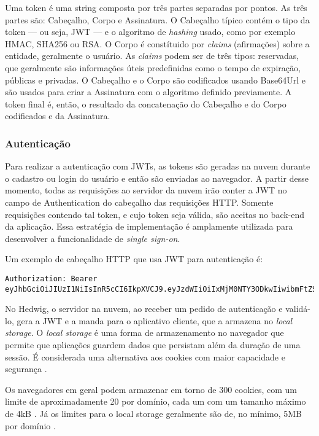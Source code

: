 Uma token é uma string composta por três partes separadas por pontos. As três partes são: Cabeçalho, Corpo e Assinatura. O Cabeçalho típico contém o tipo da token --- ou seja, JWT --- e o algoritmo de \textit{hashing} usado, como por exemplo HMAC, SHA256 ou RSA. O Corpo é constítuido por \textit{claims} (afirmações) sobre a entidade, geralmente o usuário. As \textit{claims} podem ser de três tipos: reservadas, que geralmente são informações úteis predefinidas como o tempo de expiração, públicas e privadas. O Cabeçalho e o Corpo são codificados usando Base64Url e são usados para criar a Assinatura com o algoritmo definido previamente. A token final é, então, o resultado da concatenação do Cabeçalho e do Corpo codificados e da Assinatura.

\subsubsection{Autenticação}

Para realizar a autenticação com JWTs, as tokens são geradas na nuvem durante o cadastro ou login do usuário e então são enviadas ao navegador. A partir desse momento, todas as requisições ao servidor da nuvem irão conter a JWT no campo de Authentication do cabeçalho das requisições HTTP. Somente requisições contendo tal token, e cujo token seja válida, são aceitas no back-end da aplicação. Essa estratégia de implementação é amplamente utilizada para desenvolver a funcionalidade de \textit{single sign-on}.

Um exemplo de cabeçalho HTTP que usa JWT para autenticação é:

\begin{lstlisting}
Authorization: Bearer eyJhbGciOiJIUzI1NiIsInR5cCI6IkpXVCJ9.eyJzdWIiOiIxMjM0NTY3ODkwIiwibmFtZSI6IkpvaG4gRG9lIiwiYWRtaW4iOnRydWV9.TJVA95OrM7E2cBab30RMHrHDcEfxjoYZgeFONFh7HgQ
\end{lstlisting}

No Hedwig, o servidor na nuvem, ao receber um pedido de autenticação e validá-lo, gera a JWT e a manda para o aplicativo cliente, que a armazena no \textit{local storage}. O \textit{local storage} é uma forma de armazenamento no navegador que permite que aplicações guardem dados que persistam além da duração de uma sessão. É considerada uma alternativa aos cookies com maior capacidade e segurança \cite{w3cWebStorage}.

Os navegadores em geral podem armazenar em torno de 300 cookies, com um limite de aproximadamente 20 por domínio, cada um com um tamanho máximo de 4kB \cite{cookies}. Já os limites para o local storage geralmente são de, no mínimo, 5MB por domínio \cite{localstorage}.

